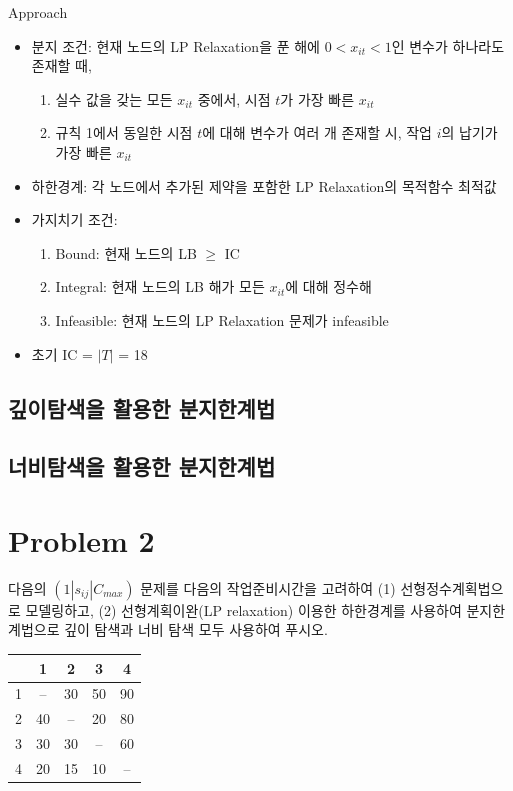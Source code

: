 \documentclass[10pt]{article}
\begin{document}
\begin{stabilitybox}{Approach}
    \begin{itemize}[leftmargin=1em]
        \item 분지 조건: 현재 노드의 LP Relaxation을 푼 해에 $0 < x_{it} < 1$인 변수가 하나라도 존재할 때,
        \begin{enumerate}
            \item 실수 값을 갖는 모든 $x_{it}$ 중에서, 시점 $t$가 가장 빠른 $x_{it}$
            \item 규칙 1에서 동일한 시점 $t$에 대해 변수가 여러 개 존재할 시, 작업 $i$의 납기가 가장 빠른 $x_{it}$
        \end{enumerate}
        \item 하한경계: 각 노드에서 추가된 제약을 포함한 LP Relaxation의 목적함수 최적값
        \item 가지치기 조건: 
        \begin{enumerate}
            \item Bound: 현재 노드의 LB $\ge$ IC
            \item Integral: 현재 노드의 LB 해가 모든 $x_{it}$에 대해 정수해
            \item Infeasible: 현재 노드의 LP Relaxation 문제가 infeasible
        \end{enumerate}
        \item 초기 IC = $|T|$ = 18 
    \end{itemize}
\end{stabilitybox}

\subsection{깊이탐색을 활용한 분지한계법}

\subsection{너비탐색을 활용한 분지한계법} 

\newpage
\section{Problem 2}
다음의 $(1|s_{ij}|C_{max})$ 문제를 다음의 작업준비시간을 고려하여 (1) 선형정수계획법으로 모델링하고, (2) 선형계획이완(LP relaxation) 이용한 하한경계를 사용하여 분지한계법으로 깊이 탐색과 너비 탐색 모두 사용하여 푸시오. 
\begin{table}[h!]
\centering
\begin{tabular}{c|cccc}
\hline
 & 1 & 2 & 3 & 4 \\ \hline
1 & -- & 30 & 50 & 90 \\
2 & 40 & -- & 20 & 80 \\
3 & 30 & 30 & -- & 60 \\
4 & 20 & 15 & 10 & -- \\ \hline
\end{tabular}
\end{table}
\end{document}
